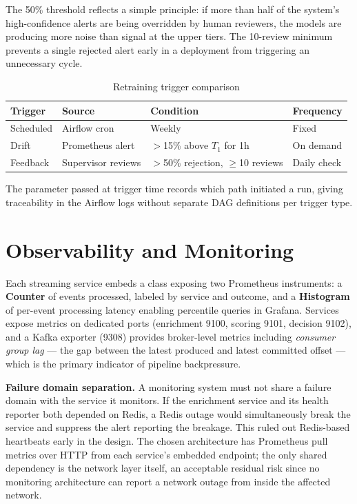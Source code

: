 The 50\% threshold reflects a simple principle: if more than half of the system's high-confidence alerts are being overridden by human reviewers, the models are producing more noise than signal at the upper tiers. The 10-review minimum prevents a single rejected alert early in a deployment from triggering an unnecessary cycle.

\begin{table}[htbp]
\centering
\small
\caption{Retraining trigger comparison}
\begin{tabular}{@{}llll@{}}
\toprule
\textbf{Trigger} & \textbf{Source} & \textbf{Condition} & \textbf{Frequency} \\
\midrule
Scheduled & Airflow cron & Weekly & Fixed \\
Drift & Prometheus alert & $>$15\% above $T_1$ for 1h & On demand \\
Feedback & Supervisor reviews & $>$50\% rejection, $\geq$10 reviews & Daily check \\
\bottomrule
\end{tabular}
\end{table}

The  parameter passed at trigger time records which path initiated a run, giving traceability in the Airflow logs without separate DAG definitions per trigger type.

\section{Observability and Monitoring}

Each streaming service embeds a  class exposing two Prometheus instruments: a \textbf{Counter} of events processed, labeled by service and outcome, and a \textbf{Histogram} of per-event processing latency enabling percentile queries in Grafana. Services expose metrics on dedicated ports (enrichment 9100, scoring 9101, decision 9102), and a Kafka exporter (9308) provides broker-level metrics including \emph{consumer group lag} --- the gap between the latest produced and latest committed offset --- which is the primary indicator of pipeline backpressure.

\textbf{Failure domain separation.} A monitoring system must not share a failure domain with the service it monitors. If the enrichment service and its health reporter both depended on Redis, a Redis outage would simultaneously break the service and suppress the alert reporting the breakage. This ruled out Redis-based heartbeats early in the design. The chosen architecture has Prometheus pull metrics over HTTP from each service's embedded endpoint; the only shared dependency is the network layer itself, an acceptable residual risk since no monitoring architecture can report a network outage from inside the affected network.


